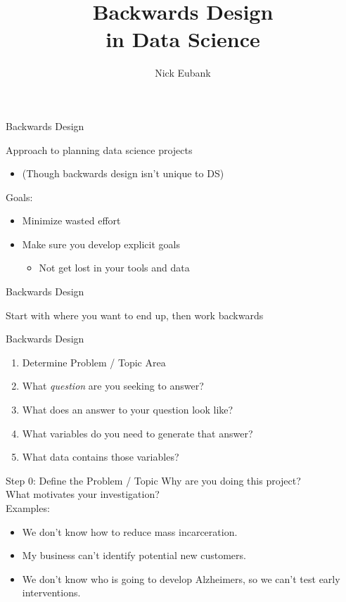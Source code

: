 \documentclass[11pt]{beamer}
\title{Backwards Design \\ in Data Science}
\author{\small Nick Eubank}
\date{\vspace*{.3in} \date}
\begin{document}
\begin{frame}
\maketitle
\end{frame}

\begin{frame}[c]{Backwards Design}

Approach to planning data science projects
  \begin{itemize}
    \pause \item (Though backwards design isn't unique to DS)
  \end{itemize}
Goals:
\begin{itemize}
  \item Minimize wasted effort
  \pause \item Make sure you develop explicit goals
  \begin{itemize}
    \item Not get lost in your tools and data
  \end{itemize}
\end{itemize}
\end{frame}

\begin{frame}[c]{Backwards Design}

  Start with where you want to end up, then work backwards

\end{frame}

\begin{frame}[c]{Backwards Design}
  \begin{enumerate}
    \pause \item Determine Problem / Topic Area
    \pause \item What \emph{question} are you seeking to answer?
    \pause \item What does an answer to your question look like?
    \pause \item What variables do you need to generate that answer?
    \pause \item What data contains those variables?
  \end{enumerate}
\end{frame}

\begin{frame}[c]{Step 0: Define the \alert{Problem / Topic}}
Why are you doing this project? \\
\pause What \alert{motivates} your investigation?\\
\vspace*{0.1cm}
\pause Examples:
\begin{itemize}
    \item We don't know how to reduce mass incarceration.
    \item My business can't identify potential new customers.
    \item We don't know who is going to develop Alzheimers, so we can't test early interventions.
\end{itemize}
\end{frame}
\end{document}
